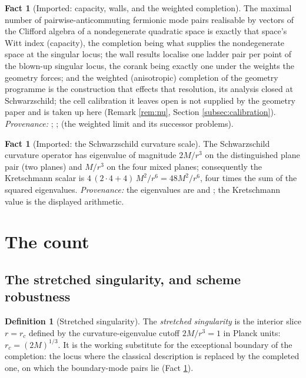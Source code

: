 \documentclass[11pt]{article}
\theoremstyle{definition}
\newtheorem{definition}[theorem]{Definition}
\newtheorem{fact}[theorem]{Fact}
\begin{document}
\begin{fact}[Imported: capacity, walls, and the weighted completion]\label{fact:capacity}
The maximal number of pairwise-anticommuting fermionic mode pairs realisable by vectors of the Clifford algebra of a nondegenerate quadratic space is exactly that space's Witt index (capacity), the completion being what supplies the nondegenerate space at the singular locus; the wall results localise one ladder pair per point of the blown-up singular locus, the corank being exactly one under the weights the geometry forces; and the weighted (anisotropic) completion of the geometry programme is the construction that effects that resolution, its analysis closed at Schwarzschild; the cell calibration it leaves open is not supplied by the geometry paper and is taken up here (Remark \ref{rem:nu}, Section \ref{subsec:calibration}). \emph{Provenance:} \cite[Thm.~4.3]{ButlerT3}; \cite[\S 5 and \S 8]{ButlerT4}; \cite[\S 5 and \S 7]{ButlerT6} (the weighted limit and its successor problems).
\end{fact}

\begin{fact}[Imported: the Schwarzschild curvature scale]\label{fact:curvature}
The Schwarzschild curvature operator has eigenvalue of magnitude $2M/r^3$ on the distinguished plane pair (two planes) and $M/r^3$ on the four mixed planes; consequently the Kretschmann scalar is $4\,(2 \cdot 4 + 4)\,M^2/r^6 = 48M^2/r^6$, four times the sum of the squared eigenvalues. \emph{Provenance:} the eigenvalues are \cite[App.~A]{ButlerT5} and \cite[Fact 2.2]{ButlerT6}; the Kretschmann value is the displayed arithmetic.
\end{fact}

\section{The count}\label{sec:count}

\subsection{The stretched singularity, and scheme robustness}\label{subsec:stretched}

\begin{definition}[Stretched singularity]\label{def:stretched}
The \emph{stretched singularity} is the interior slice $r = r_c$ defined by the curvature-eigenvalue cutoff $2M/r^3 = 1$ in Planck units: $r_c = (2M)^{1/3}$. It is the working substitute for the exceptional boundary of the completion: the locus where the classical description is replaced by the completed one, on which the boundary-mode pairs lie (Fact \ref{fact:capacity}).
\end{definition}
\end{document}
